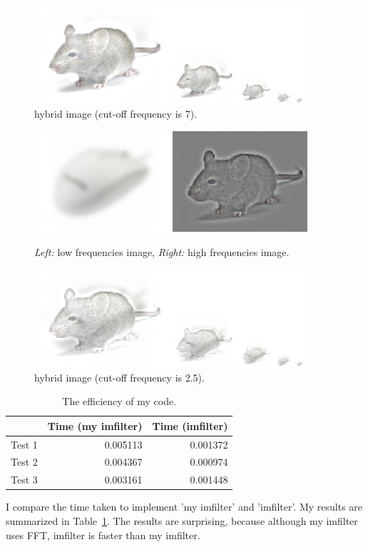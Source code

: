 \begin{figure}[h]
    \centering
    \includegraphics[width=10cm]{questions/hybrid_image_scales2.jpg}
    \caption{hybrid image (cut-off frequency is 7).}
    \label{fig:result2}
\end{figure}

\begin{figure}[h]
    \centering
    \includegraphics[width=5cm]{questions/low_frequencies.jpg}
    \includegraphics[width=5cm]{questions/high_frequencies.jpg}
    \caption{\emph{Left:} low frequencies image,  \emph{Right:} high frequencies image.}
    \label{fig:result3}
\end{figure}

\begin{figure}[h]
    \centering
    \includegraphics[width=10cm]{questions/hybrid_image_scales.jpg}
    \caption{hybrid image (cut-off frequency is 2.5).}
    \label{fig:result4}
\end{figure}
\begin{table}
    \centering
    \begin{tabular}{lrr}
        \toprule
         & Time (my imfilter) & Time (imfilter)\\
        \midrule
        Test 1 & 0.005113 & 0.001372\\
        Test 2 & 0.004367 & 0.000974\\
        Test 3 & 0.003161 & 0.001448\\
        \bottomrule
    \end{tabular}
    \caption{The efficiency of my code.}
    \label{tab:table1}
\end{table}

I compare the time taken to implement 'my imfilter' and 'imfilter'. My results are summarized in Table~\ref{tab:table1}. The results are surprising, because although my imfilter uses FFT, imfilter is faster than my imfilter. 


